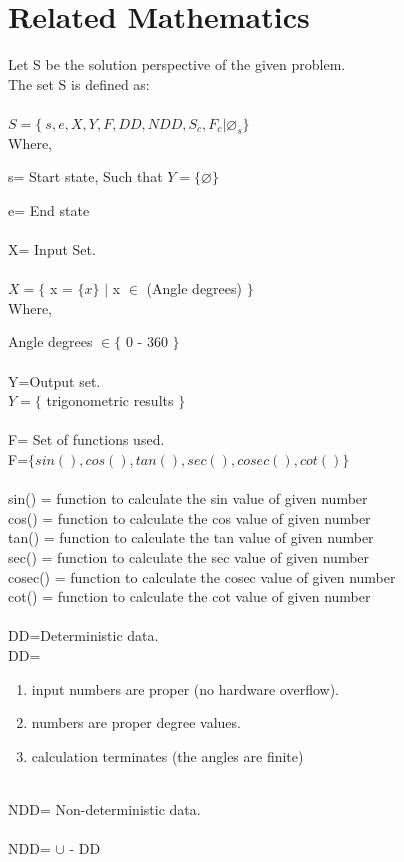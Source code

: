 \documentclass[10pt,a4paper]{article}
\begin{document}
\section{Related Mathematics}
Let S be the solution perspective of the given problem.\\
The set S is defined as:\\\\
$S=\lbrace\ s,e,X,Y,F,DD,NDD,S_{c},F_{c}|\varnothing_{s}\rbrace$ \\
Where,

s= Start state,  Such that $Y=\lbrace \varnothing \rbrace$ 

e= End state  \\\\
X= Input Set. \\\\
$X=\lbrace$ x = $\lbrace x \rbrace$ $\mid$ x $\in$ (Angle degrees) $\rbrace$ \\
Where,

Angle degrees $\in \lbrace$ 0 - 360 $\rbrace$ \\\\ 
Y=Output set.\\
$Y=\lbrace$ trigonometric results $\rbrace $ \\\\
F= Set of functions used.\\
F=$\lbrace sin(), cos(), tan(), sec(), cosec(), cot() \rbrace$ \\\\
sin() = function to calculate the sin value of given number\\
cos() = function to calculate the cos value of given number\\
tan() = function to calculate the tan value of given number\\
sec() = function to calculate the sec value of given number\\
cosec() = function to calculate the cosec value of given number\\
cot() = function to calculate the cot value of given number\\\\
DD=Deterministic data. \\
DD=
\begin{enumerate}
\item input numbers are proper (no hardware overflow).
\item numbers are proper degree values.
\item calculation terminates (the angles are finite)\\\\
\end{enumerate}
NDD= Non-deterministic data. \\
\\NDD= $\cup$ - DD\\
\end{document}
